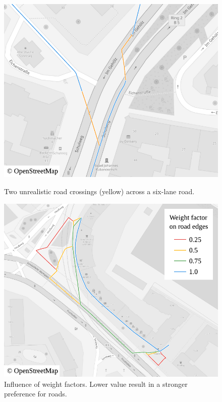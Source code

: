 			\begin{figure}[h!]
				\begin{minipage}[t]{.48\textwidth}
					\begin{figcenter}
						\includegraphics[width=\textwidth]{images/qgis-routing-city-roads}
					\end{figcenter}
					\caption{Two unrealistic road crossings (yellow) across a six-lane road.}
					\label{fig:eval-city-road-crossing}
				\end{minipage}
				\hfill
				\begin{minipage}[t]{.48\textwidth}
					\begin{figcenter}
						\includegraphics[width=\textwidth]{images/qgis-routing-city-weights}
					\end{figcenter}
					\caption{Influence of weight factors. Lower value result in a stronger preference for roads.}
					\label{fig:eval-city-weights}
				\end{minipage}
			\end{figure}
			
